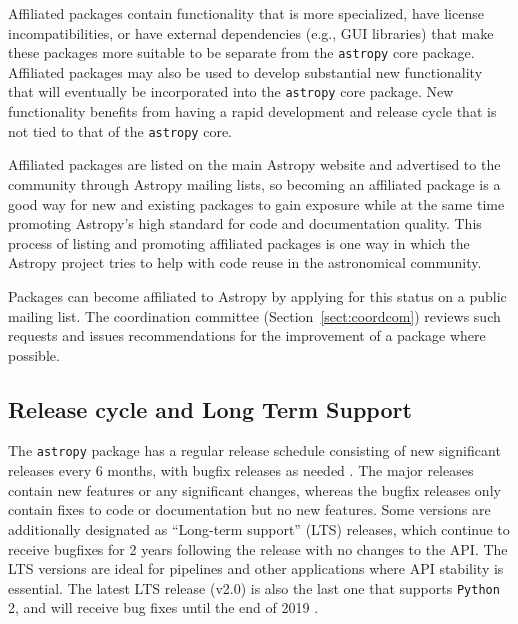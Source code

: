 \documentclass[modern]{aastex61}
\newcommand{\package}[1]{\texttt{#1}\xspace}
\newcommand{\python}{\package{Python}}
\newcommand{\astropy}{Astropy\xspace}
\newcommand{\astropypkg}{\package{astropy}}
\newcommand{\sectionname}{Section\xspace}
\newcommand{\inlinecomment}[2]{\todo[inline]{#1: #2}\xspace}
\begin{document}
Affiliated packages contain functionality that is more specialized,
have license incompatibilities, or have external dependencies (e.g., GUI
libraries) that make these packages more suitable to be separate from the
\astropypkg core package.
Affiliated packages may also be used to develop substantial new functionality
that will eventually be incorporated into the \astropypkg core package.
New functionality benefits from having a rapid development and release cycle that is not tied to that of the \astropypkg core.

Affiliated packages are listed on the main \astropy website and advertised to the community through \astropy mailing lists, so becoming an affiliated package is a good way for new and existing packages to gain exposure while at the same time promoting \astropy's high standard for code and documentation quality. This process of listing and promoting affiliated packages is one way in which the \astropy project tries to help with \inlinecomment{AG}{Increase?} code reuse in the astronomical community.

Packages can become affiliated to \astropy by applying for this status on a public mailing list. The coordination committee (\sectionname~\ref{sect:coordcom}) reviews such requests and issues recommendations for the improvement of a package where possible.



\subsection{Release cycle and Long Term Support}

The \astropypkg package has a regular release schedule consisting of new significant
releases every 6 months, with bugfix releases as needed \citep{ape2}.
The major releases contain new features or any significant changes, whereas
the bugfix releases only contain fixes to code or documentation but no new
features.
Some versions are additionally designated as ``Long-term support'' (LTS)
releases, which continue to receive bugfixes for 2 years following the release
with no changes to the API\@.
The LTS versions are ideal for pipelines and other applications where API
stability is essential.
The latest LTS release (v2.0) is also the last one that supports \python 2, and
will receive bug fixes until the end of 2019 \citep{ape10}.
\end{document}

